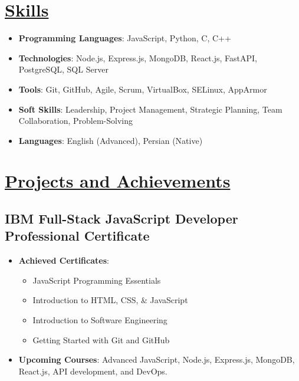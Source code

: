 \documentclass[a4paper,9pt]{article}
\newcommand{\mainsection}[1]{\underline{#1}}
\begin{document}
\section*{\mainsection{Skills}}
\begin{itemize}[leftmargin=*]
  \item \textbf{Programming Languages}: JavaScript, Python, C, C++
  \item \textbf{Technologies}: Node.js, Express.js, MongoDB, React.js, FastAPI, PostgreSQL, SQL Server
  \item \textbf{Tools}: Git, GitHub, Agile, Scrum, VirtualBox, SELinux, AppArmor
  \item \textbf{Soft Skills}: Leadership, Project Management, Strategic Planning, Team Collaboration, Problem-Solving
  \item \textbf{Languages}: English (Advanced), Persian (Native)
\end{itemize}

\section*{\mainsection{Projects and Achievements}}

\subsection*{IBM Full-Stack JavaScript Developer Professional Certificate}
\begin{multicols}{2}
\begin{itemize}[leftmargin=*]
  \item \textbf{Achieved Certificates}: 
    \begin{itemize}[leftmargin=*]
      \item JavaScript Programming Essentials
      \item Introduction to HTML, CSS, \& JavaScript
      \item Introduction to Software Engineering
      \item Getting Started with Git and GitHub
    \end{itemize}
  \item \textbf{Upcoming Courses}: Advanced JavaScript, Node.js, Express.js, MongoDB, React.js, API development, and DevOps.
\end{itemize}
\end{multicols}
\end{document}
